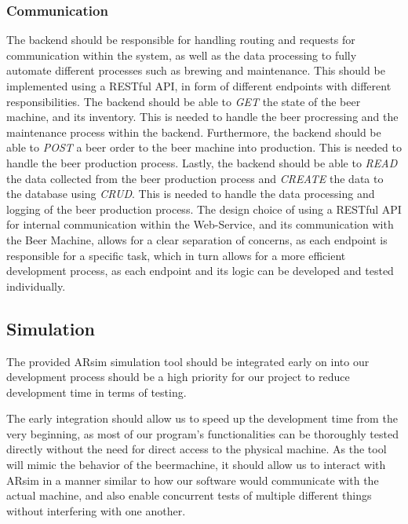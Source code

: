 \subsubsection{Communication}
The backend should be responsible for handling routing and requests for communication within the system, as well as the data processing to fully automate different processes such as brewing and maintenance. This should be implemented using a RESTful API, in form of different endpoints with different responsibilities. \newline
The backend should be able to \textit{GET} the state of the beer machine, and its inventory. This is needed to handle the beer procressing and the maintenance process within the backend.\newline
Furthermore, the backend should be able to \textit{POST} a beer order to the beer machine into production. This is needed to handle the beer production process.\newline
Lastly, the backend should be able to \textit{READ} the data collected from the beer production process and \textit{CREATE} the data to the database using \textit{CRUD}. This is needed to handle the data processing and logging of the beer production process.
The design choice of using a RESTful API for internal communication within the Web-Service, and its communication with the Beer Machine, allows for a clear separation of concerns, as each endpoint is responsible for a specific task, which in turn allows for a more efficient development process, as each endpoint and its logic can be developed and tested individually. \cite{7}

\subsection{Simulation}
The provided ARsim simulation tool should be integrated early on into our development process should be a high priority for our project to reduce development time in terms of testing.

The early integration should allow us to speed up the development time from the very beginning, as most of our program's functionalities can be thoroughly tested directly without the need for direct access to the physical machine.
As the tool will mimic the behavior of the beermachine, it should allow us to interact with ARsim in a manner similar to how our software would communicate with the actual machine, and also enable concurrent tests of multiple different things without interfering with one another.

